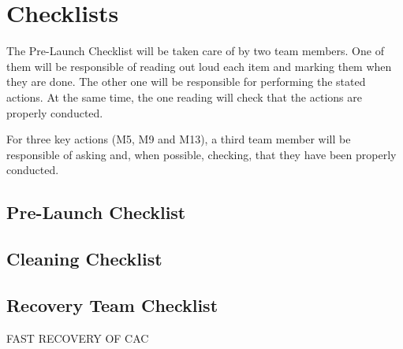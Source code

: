 \newpage
\section{Checklists}\label{sec:Checklist}


The Pre-Launch Checklist will be taken care of by two team members. One of them will be responsible of reading out loud each item and marking them when they are done. The other one will be responsible for performing the stated actions. At the same time, the one reading will check that the actions are properly conducted. 

For three key actions (M5, M9 and M13), a third team member will be responsible of asking and, when possible, checking, that they have been properly conducted. 

\subsection{Pre-Launch Checklist}\label{sec:appL}

\subsection{Cleaning Checklist}


\subsection{Recovery Team Checklist}\label{ssec:RecoveryCheck}

FAST RECOVERY OF CAC

